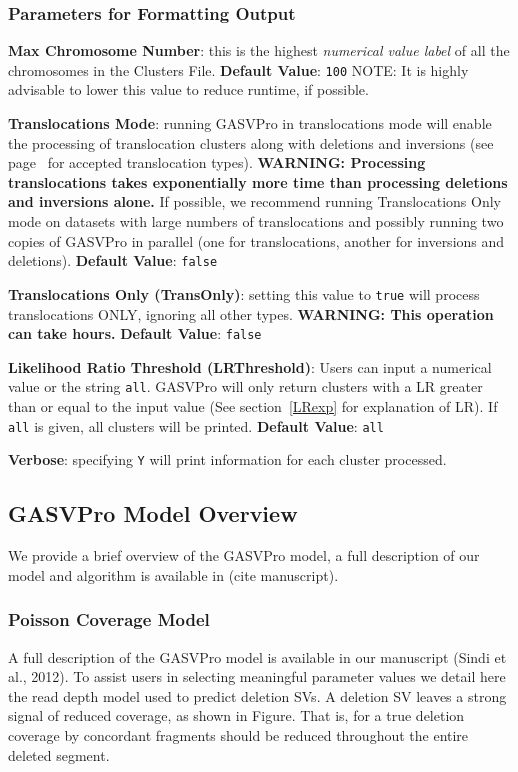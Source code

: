 \documentclass[11pt]{article}
\begin{document}
\subsubsection{Parameters for Formatting Output}
\begin{description}
\item{\bf Max Chromosome Number}:  this is the highest {\em numerical value label} of all the chromosomes in the Clusters File. {\bf Default Value}: \verb+100+ {\scriptsize NOTE: It is highly advisable to lower this value to reduce runtime, if possible.}
\item {\bf Translocations Mode}: running GASVPro in translocations mode will enable the processing of translocation clusters along with deletions and inversions (see page~\pageref{structvartypes} for accepted translocation types). {\bf WARNING: Processing translocations takes exponentially more time than processing deletions and inversions alone.} If possible, we recommend running Translocations Only mode on datasets with large numbers of translocations and possibly running two copies of GASVPro in parallel (one for translocations, another for inversions and deletions). {\bf Default Value}: \verb+false+

\item {\bf Translocations Only (TransOnly)}: setting this value to \verb+true+ will process translocations ONLY, ignoring all other types. {\bf WARNING: This operation can take hours.} {\bf Default Value}: \verb+false+
\item {\bf Likelihood Ratio Threshold (LRThreshold)}: Users can input a numerical value or the string \verb+all+. GASVPro will only return clusters with a LR greater than or equal to the input value (See section~\ref{LRexp} for explanation of LR). If \verb+all+ is given, all clusters will be printed. {\bf Default Value}: \verb+all+
\item {\bf Verbose}: specifying \verb+Y+ will print information for each cluster processed. 
\end{description}

\subsection{GASVPro Model Overview}
\label{sec:modeloverview}

We provide a brief overview of the GASVPro model, a full description of our model and algorithm is available in (cite manuscript).

\subsubsection{Poisson Coverage Model}
 A full description of the GASVPro model is available in our manuscript (Sindi et al., 2012). To assist users in selecting meaningful parameter values we detail here the read depth model used to predict deletion SVs.  A deletion SV leaves a strong signal of reduced coverage, as shown in Figure. That is, for a true deletion coverage by concordant fragments should be reduced throughout the entire deleted segment. 
 
\end{document}
